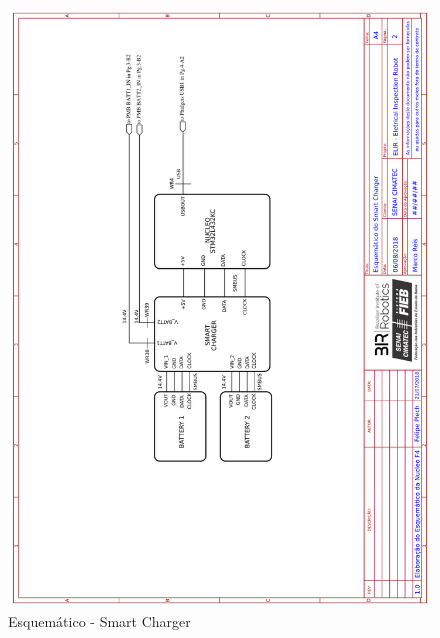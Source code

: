     \begin{figure}[H]
	\centering
	\includegraphics[width=14cm]{Figures/EsquematicoCHARGER.png}
	\caption{Esquemático - Smart Charger} \label{SmartCharger}
	\end{figure}
	
    \pagebreak
    

